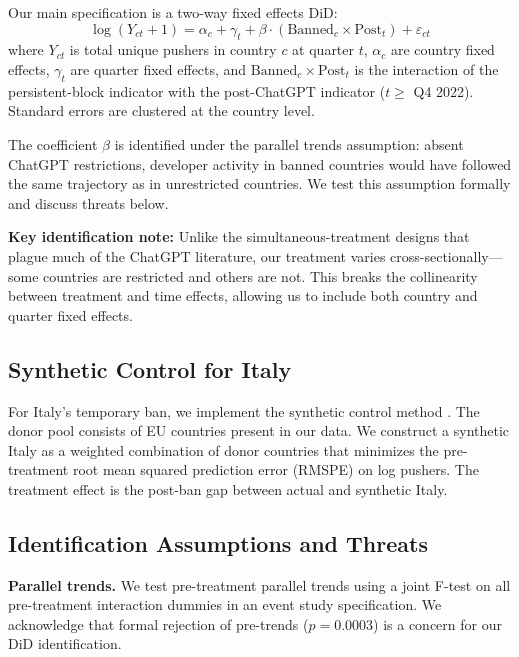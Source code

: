 \documentclass[12pt]{article}
\begin{document}
Our main specification is a two-way fixed effects DiD:
\begin{equation}
\log(Y_{ct} + 1) = \alpha_c + \gamma_t + \beta \cdot (\text{Banned}_c \times \text{Post}_t) + \varepsilon_{ct}
\label{eq:did}
\end{equation}
where $Y_{ct}$ is total unique pushers in country $c$ at quarter $t$, $\alpha_c$ are country fixed effects, $\gamma_t$ are quarter fixed effects, and $\text{Banned}_c \times \text{Post}_t$ is the interaction of the persistent-block indicator with the post-ChatGPT indicator ($t \geq$ Q4 2022). Standard errors are clustered at the country level.

The coefficient $\beta$ is identified under the parallel trends assumption: absent ChatGPT restrictions, developer activity in banned countries would have followed the same trajectory as in unrestricted countries. We test this assumption formally and discuss threats below.

\textbf{Key identification note:} Unlike the simultaneous-treatment designs that plague much of the ChatGPT literature, our treatment varies cross-sectionally---some countries are restricted and others are not. This breaks the collinearity between treatment and time effects, allowing us to include both country and quarter fixed effects.

\subsection{Synthetic Control for Italy}

For Italy's temporary ban, we implement the synthetic control method \citep{abadie2010synthetic}. The donor pool consists of EU countries present in our data. We construct a synthetic Italy as a weighted combination of donor countries that minimizes the pre-treatment root mean squared prediction error (RMSPE) on log pushers. The treatment effect is the post-ban gap between actual and synthetic Italy.

\subsection{Identification Assumptions and Threats}

\textbf{Parallel trends.} We test pre-treatment parallel trends using a joint F-test on all pre-treatment interaction dummies in an event study specification. We acknowledge that formal rejection of pre-trends ($p = 0.0003$) is a concern for our DiD identification.
\end{document}
